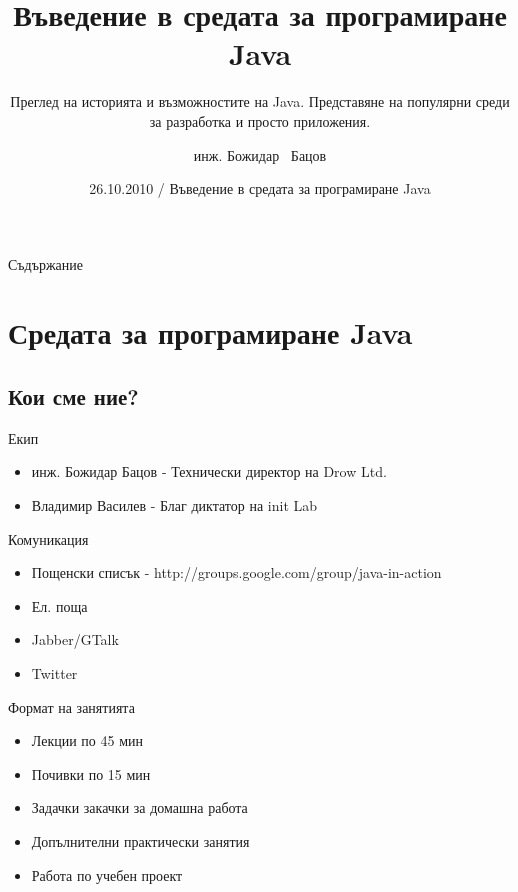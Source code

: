 \documentclass{beamer}
\title[Въведение в средата за програмиране Java] %
{Въведение в средата за програмиране Java}
\subtitle
{Преглед на историята и възможностите на Java. Представяне на
  популярни среди за разработка и просто приложения.} %
\author[инж. Божидар Бацов]{инж. Божидар ~Бацов}
\institute[Drow Ltd.]{Drow Ltd.}
\date[Java Begins]{26.10.2010 / Въведение в средата за програмиране Java}
\begin{document}
\begin{frame}
  \titlepage
\end{frame}

\begin{frame}{Съдържание}
  \tableofcontents
\end{frame}




\section{Средата за програмиране Java}

\subsection[Кои сме ние?]{Кои сме ние?}

\begin{frame}{Екип}
  \begin{itemize}
  \item
    инж. Божидар Бацов - Технически директор на Drow Ltd.
  \item
    Владимир Василев - Благ диктатор на init Lab
  \end{itemize}
\end{frame}

\begin{frame}{Комуникация}
  \begin{itemize}
  \item Пощенски списък - http://groups.google.com/group/java-in-action
  \item Ел. поща
  \item Jabber/GTalk
  \item Twitter
  \end{itemize}
\end{frame}

\begin{frame}{Формат на занятията}
  \begin{itemize}
  \item Лекции по 45 мин
  \item Почивки по 15 мин
  \item Задачки закачки за домашна работа
  \item Допълнителни практически занятия
  \item Работа по учебен проект
  \end{itemize}
\end{frame}
\end{document}
